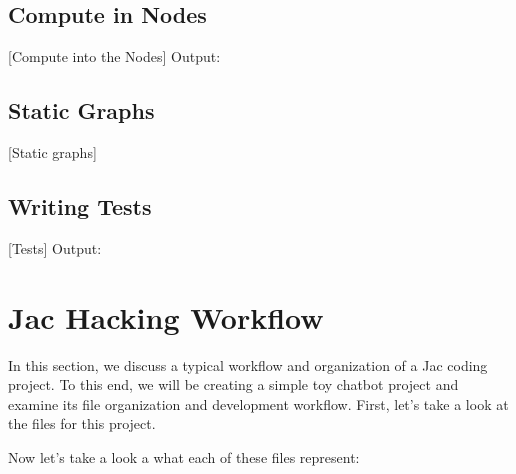 \subsection{Compute in Nodes}
[Compute into the Nodes]
Output:

\subsection{Static Graphs}
[Static graphs]

\subsection{Writing Tests}
[Tests]
Output:

\section{Jac Hacking Workflow}
In this section, we discuss a typical workflow and organization of a Jac coding project. To this end, we will be creating a simple toy chatbot project and examine its file organization and development workflow. First, let's take a look at the files for this project.
\par
{}

Now let's take a look a what each of these files represent:

